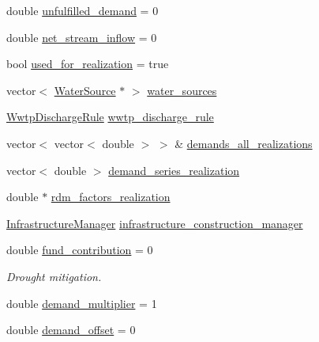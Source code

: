 \begin{DoxyCompactItemize}
\item 
double \mbox{\hyperlink{classUtility_a42e3f519823e668f9b8affb700e07d86_a42e3f519823e668f9b8affb700e07d86}{unfulfilled\+\_\+demand}} = 0
\item 
double \mbox{\hyperlink{classUtility_add2ce4f2dd3feefe6d9c28ca59f6a0de_add2ce4f2dd3feefe6d9c28ca59f6a0de}{net\+\_\+stream\+\_\+inflow}} = 0
\item 
bool \mbox{\hyperlink{classUtility_a4333d1e4444eeaf94acee51a7af35fb0_a4333d1e4444eeaf94acee51a7af35fb0}{used\+\_\+for\+\_\+realization}} = true
\item 
vector$<$ \mbox{\hyperlink{classWaterSource}{Water\+Source}} $\ast$ $>$ \mbox{\hyperlink{classUtility_a86ff2c92fc7f1b6bdca4bc84fdb535db_a86ff2c92fc7f1b6bdca4bc84fdb535db}{water\+\_\+sources}}
\item 
\mbox{\hyperlink{classWwtpDischargeRule}{Wwtp\+Discharge\+Rule}} \mbox{\hyperlink{classUtility_a0c598532230472e8106f6a71f97ea62d_a0c598532230472e8106f6a71f97ea62d}{wwtp\+\_\+discharge\+\_\+rule}}
\item 
vector$<$ vector$<$ double $>$ $>$ \& \mbox{\hyperlink{classUtility_a8ffed6cb590d6f0855128828c3f289b8_a8ffed6cb590d6f0855128828c3f289b8}{demands\+\_\+all\+\_\+realizations}}
\item 
vector$<$ double $>$ \mbox{\hyperlink{classUtility_a2f001332138af9aecd260ed1ad2348f4_a2f001332138af9aecd260ed1ad2348f4}{demand\+\_\+series\+\_\+realization}}
\item 
double $\ast$ \mbox{\hyperlink{classUtility_a9888a401fb708200eb282799583762c9_a9888a401fb708200eb282799583762c9}{rdm\+\_\+factors\+\_\+realization}}
\item 
\mbox{\hyperlink{classInfrastructureManager}{Infrastructure\+Manager}} \mbox{\hyperlink{classUtility_a2eff94831dd7a4b7a4243ef69c5311d9_a2eff94831dd7a4b7a4243ef69c5311d9}{infrastructure\+\_\+construction\+\_\+manager}}
\item 
double \mbox{\hyperlink{classUtility_ae2dae3ed65967f89675218c3b55ef9f1_ae2dae3ed65967f89675218c3b55ef9f1}{fund\+\_\+contribution}} = 0
\begin{DoxyCompactList}\small\item\em Drought mitigation. \end{DoxyCompactList}\item 
double \mbox{\hyperlink{classUtility_ad1de23b261a8a1b6db86651d48b7abcd_ad1de23b261a8a1b6db86651d48b7abcd}{demand\+\_\+multiplier}} = 1
\item 
double \mbox{\hyperlink{classUtility_ab6711489e4242a1871a8ed80066920eb_ab6711489e4242a1871a8ed80066920eb}{demand\+\_\+offset}} = 0

\end{DoxyCompactItemize}
